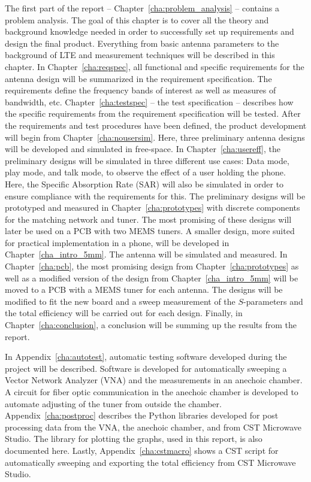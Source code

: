 The first part of the report -- Chapter~\ref{cha:problem_analysis} -- contains a problem analysis. The goal of this chapter is to cover all the theory and background knowledge needed in order to successfully set up requirements and design the final product. Everything from basic antenna parameters to the background of LTE and measurement techniques will be described in this chapter. 
In Chapter~\ref{cha:reqspec}, all functional and specific requirements for the antenna design will be summarized in the requirement specification. The requirements define the frequency bands of interest as well as measures of bandwidth, etc. 
Chapter~\ref{cha:testspec} -- the test specification -- describes how the specific requirements from the requirement specification will be tested.
After the requirements and test procedures have been defined, the product development will begin from Chapter~\ref{cha:nousersim}. Here, three preliminary antenna designs will be developed and simulated in free-space. 
In Chapter~\ref{cha:usereff}, the preliminary designs will be simulated in three different use cases: Data mode, play mode, and talk mode, to observe the effect of a user holding the phone. Here, the Specific Absorption Rate (SAR) will also be simulated in order to ensure compliance with the requirements for this.
The preliminary designs will be prototyped and measured in Chapter~\ref{cha:prototypes} with discrete components for the matching network and tuner. The most promising of these designs will later be used on a PCB with two MEMS tuners.
A smaller design, more suited for practical implementation in a phone, will be developed in Chapter~\ref{cha_intro_5mm}. The antenna will be simulated and measured.
In Chapter~\ref{cha:pcb}, the most promising design from Chapter~\ref{cha:prototypes} as well as a modified version of the design from Chapter~\ref{cha_intro_5mm} will be moved to a PCB with a MEMS tuner for each antenna. The designs will be modified to fit the new board and a sweep measurement of the $S$-parameters and the total efficiency will be carried out for each design.
Finally, in Chapter~\ref{cha:conclusion}, a conclusion will be summing up the results from the report.

In Appendix~\ref{cha:autotest}, automatic testing software developed during the project will be described. Software is developed for automatically sweeping a Vector Network Analyzer (VNA) and the measurements in an anechoic chamber. A circuit for fiber optic communication in the anechoic chamber is developed to automate adjusting of the tuner from outside the chamber.
Appendix~\ref{cha:postproc} describes the Python libraries developed for post processing data from the VNA, the anechoic chamber, and from CST Microwave Studio. The library for plotting the graphs, used in this report, is also documented here.
Lastly, Appendix~\ref{cha:cstmacro} shows a CST script for automatically sweeping and exporting the total efficiency from CST Microwave Studio.
